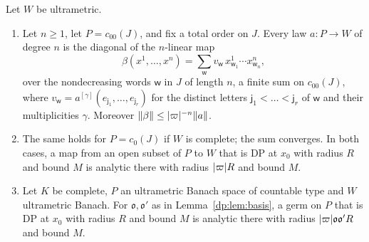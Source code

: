 \begin{theorem}\label{dp:thm:c0-agreement}
Let $W$ be ultrametric.
\begin{enumerate}
\item Let $n\ge1$, let $P=c_{00}(J)$, and fix a total order on $J$. Every law $a\colon P\to W$ of degree $n$ is the diagonal of the $n$\nobreakdash-linear map
\[
 \beta(x^1,\dots,x^n)=\sum_{\mathsf w}v_{\mathsf w}\,x^1_{\mathsf w_1}\cdots x^n_{\mathsf w_n},
\]
over the nondecreasing words $\mathsf w$ in $J$ of length $n$, a finite sum on $c_{00}(J)$, where $v_{\mathsf w}=a^{[\gamma]}(e_{\mathsf j_1},\dots,e_{\mathsf j_r})$ for the distinct letters $\mathsf j_1<\dots<\mathsf j_r$ of $\mathsf w$ and their multiplicities $\gamma$. Moreover $\lVert \beta\rVert\le\lvert \varpi\rvert^{-n}\lVert a\rVert$.
\item The same holds for $P=c_0(J)$ if $W$ is complete; the sum converges. In both cases, a map from an open subset of $P$ to $W$ that is DP at $x_0$ with radius $R$ and bound $M$ is analytic there with radius $\lvert \varpi\rvert R$ and bound $M$.
\item Let $K$ be complete, $P$ an ultrametric Banach space of countable type and $W$ ultrametric Banach. For $\mathfrak o,\mathfrak o'$ as in Lemma~\ref{dp:lem:basis}, a germ on $P$ that is DP at $x_0$ with radius $R$ and bound $M$ is analytic there with radius $\lvert \varpi\rvert\mathfrak o\mathfrak o'R$ and bound $M$.
\end{enumerate}
\end{theorem}

